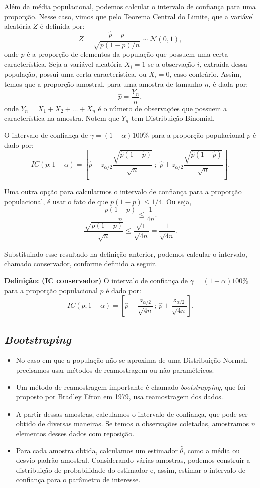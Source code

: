 \documentclass{article}
\begin{document}
Além da média populacional, podemos calcular o intervalo de confiança para uma proporção. Nesse caso, vimos que pelo Teorema Central do Limite, que a variável aleatória $Z$ é definida por:
    $$
    Z = \frac{\hat{p} - p}{\sqrt{p(1-p)/n}} \sim \mathcal{N}(0,1),
    $$
onde $p$ é a proporção de elementos da população que possuem uma certa característica. Seja a variável aleatória $X_i = 1$ se a observação $i$, extraída dessa população, possui uma certa característica, ou $X_i = 0$, caso contrário. Assim, temos que a proporção amostral, para uma amostra de tamanho $n$, é dada por:
    $$
    \hat{p} = \frac{Y_n}{n},
    $$
onde $Y_n = X_1 + X_2 + \dots + X_n$ é o número de observações que possuem a característica na amostra. Notem que $Y_n$ tem Distribuição Binomial.

O intervalo de confiança de $\gamma = (1 - \alpha)100\%$ para a proporção populacional $p$ é dado por:
    $$
    IC(p; 1-\alpha) = 
    \left[
    \hat{p} - z_{\alpha/2}\frac{\sqrt{\hat{p}(1-\hat{p})}}{\sqrt{n}} \;;\;
    \hat{p} + z_{\alpha/2}\frac{\sqrt{\hat{p}(1-\hat{p})}}{\sqrt{n}}
    \right].
    $$

Uma outra opção para calcularmos o intervalo de confiança para a proporção populacional, é usar o fato de que $p(1-p) \leq 1/4$. Ou seja,
    $$
    \frac{p(1-p)}{n} \leq \frac{1}{4n}.
    $$
    $$
    \frac{\sqrt{p(1-p)}}{\sqrt{n}} \leq \frac{\sqrt{1}}{\sqrt{4n}} = \frac{1}{\sqrt{4n}}.
    $$

Substituindo esse resultado na definição anterior, podemos calcular o intervalo, chamado conservador, conforme definido a seguir.

\textbf{Definição: (IC conservador)} O intervalo de confiança de 
    $\gamma = (1-\alpha)100\%$ para a proporção populacional $p$ é dado por:
    $$
    IC(p; 1-\alpha) = 
    \left[
    \hat{p} - \frac{z_{\alpha/2}}{\sqrt{4n}} \, ; \,
    \hat{p} + \frac{z_{\alpha/2}}{\sqrt{4n}}
    \right].
    $$

\subsection{\textit{Bootstraping}}
\begin{itemize}
    \item No caso em que a população não se aproxima de uma Distribuição Normal, precisamos usar métodos de reamostragem ou não paramétricos.
    \item Um método de reamostragem importante é chamado \textit{bootstrapping}, que foi proposto por Bradley Efron em 1979, usa reamostragem dos dados.
    \item A partir dessas amostras, calculamos o intervalo de confiança, que pode ser obtido de diversas maneiras. Se temos $n$ observações coletadas, amostramos $n$ elementos desses dados com reposição.
    \item Para cada amostra obtida, calculamos um estimador $\hat{\theta}$, como a média ou desvio padrão amostral. Considerando várias amostras, podemos construir a distribuição de probabilidade do estimador e, assim, estimar o intervalo de confiança para o parâmetro de interesse.
\end{itemize}
\end{document}
